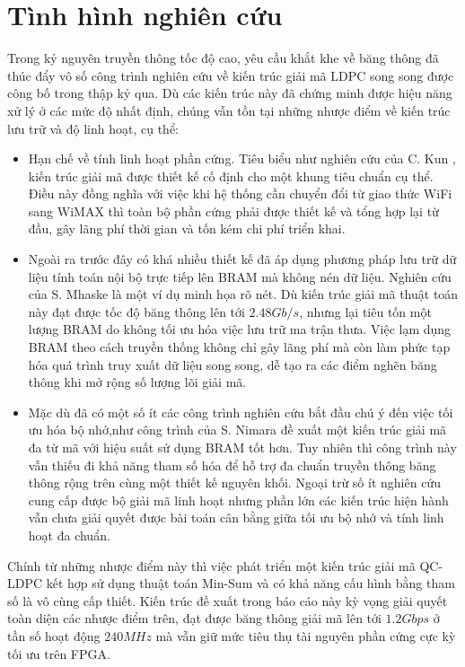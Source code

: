 \documentclass[12pt,a4paper,oneside]{book}
\begin{document}
\section{Tình hình nghiên cứu}
Trong kỷ nguyên truyền thông tốc độ cao, yêu cầu khắt khe về băng thông đã thúc đẩy vô số công trình nghiên cứu về kiến trúc giải mã LDPC song song được công bố trong thập kỷ qua. Dù các kiến trúc này đã chứng minh được hiệu năng xử lý ở các mức độ nhất định, chúng vẫn tồn tại những nhược điểm về kiến trúc lưu trữ và độ linh hoạt, cụ thể:  
\begin{itemize}
    \item Hạn chế về tính linh hoạt phần cứng. Tiêu biểu như nghiên cứu của C. Kun \cite{2}, kiến trúc giải mã được thiết kế cố định cho một khung tiêu chuẩn cụ thể. Điều này đồng nghĩa với việc khi hệ thống cần chuyển đổi từ giao thức WiFi sang WiMAX thì toàn bộ phần cứng phải được thiết kế và tổng hợp lại từ đầu, gây lãng phí thời gian và tốn kém chi phí triển khai.
    \item Ngoài ra trước đây có khá nhiều thiết kế đã áp dụng phương pháp lưu trữ dữ liệu tính toán nội bộ trực tiếp lên BRAM mà không nén dữ liệu. Nghiên cứu của S. Mhaske \cite{3} là một ví dụ minh họa rõ nét. Dù kiến trúc giải mã thuật toán này đạt được tốc độ băng thông lên tới $2.48 Gb/s$, nhưng lại tiêu tốn một lượng BRAM do không tối ưu hóa việc lưu trữ ma trận thưa. Việc lạm dụng BRAM theo cách truyền thống không chỉ gây lãng phí mà còn làm phức tạp hóa quá trình truy xuất dữ liệu song song, dễ tạo ra các điểm nghẽn băng thông khi mở rộng số lượng lõi giải mã.  
    \item Mặc dù đã có một số ít các công trình nghiên cứu bắt đầu chú ý đến việc tối ưu hóa bộ nhớ,như công trình của S. Nimara \cite{4} đề xuất một kiến trúc giải mã đa từ mã với hiệu suất sử dụng BRAM tốt hơn. Tuy nhiên thì công trình này vẫn thiếu đi khả năng tham số hóa để hỗ trợ đa chuẩn truyền thông băng thông rộng trên cùng một thiết kế nguyên khối. Ngoại trừ số ít nghiên cứu cung cấp được bộ giải mã linh hoạt nhưng phần lớn các kiến trúc hiện hành vẫn chưa giải quyết được bài toán cân bằng giữa tối ưu bộ nhớ và tính linh hoạt đa chuẩn.  
\end{itemize}

Chính từ những nhược điểm này thì việc phát triển một kiến trúc giải mã QC-LDPC kết hợp sử dụng thuật toán Min-Sum và có khả năng cấu hình bằng tham số là vô cùng cấp thiết. Kiến trúc đề xuất trong báo cáo này kỳ vọng giải quyết toàn diện các nhược điểm trên, đạt được băng thông giải mã lên tới $1.2 Gbps$ ở tần số hoạt động $240 MHz$ mà vẫn giữ mức tiêu thụ tài nguyên phần cứng cực kỳ tối ưu trên FPGA.
\end{document}
